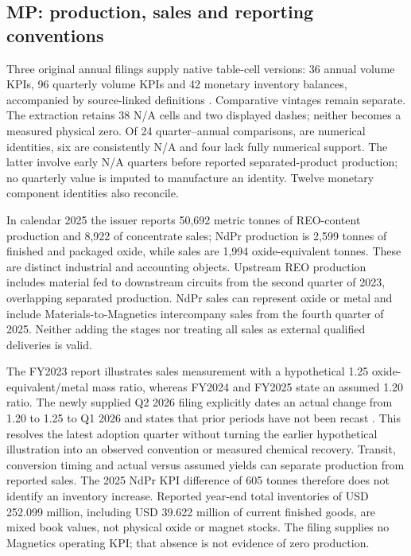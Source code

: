 \documentclass[11pt]{article}
\begin{document}
\subsection{MP: production, sales and reporting conventions}
Three original annual filings supply \MPNativeCells{} native table-cell versions: 36 annual volume KPIs, 96 quarterly volume KPIs and 42 monetary inventory balances, accompanied by \MPDefinitions{} source-linked definitions \citep{MP2023,MP2024,MP2025}. Comparative vintages remain separate. The extraction retains 38 N/A cells and two displayed dashes; neither becomes a measured physical zero. Of 24 quarter--annual comparisons, \MPNumericIdentities{} are numerical identities, six are consistently N/A and four lack fully numerical support. The latter involve early N/A quarters before reported separated-product production; no quarterly value is imputed to manufacture an identity. Twelve monetary component identities also reconcile.

In calendar 2025 the issuer reports 50,692 metric tonnes of REO-content production and 8,922 of concentrate sales; NdPr production is 2,599 tonnes of finished and packaged oxide, while sales are 1,994 oxide-equivalent tonnes. These are distinct industrial and accounting objects. Upstream REO production includes material fed to downstream circuits from the second quarter of 2023, overlapping separated production. NdPr sales can represent oxide or metal and include Materials-to-Magnetics intercompany sales from the fourth quarter of 2025. Neither adding the stages nor treating all sales as external qualified deliveries is valid.

The FY2023 report illustrates sales measurement with a hypothetical 1.25 oxide-equivalent/metal mass ratio, whereas FY2024 and FY2025 state an assumed 1.20 ratio. The newly supplied Q2 2026 filing explicitly dates an actual change from 1.20 to 1.25 to Q1 2026 and states that prior periods have not been recast \citep{MPQ22026}. This resolves the latest adoption quarter without turning the earlier hypothetical illustration into an observed convention or measured chemical recovery. Transit, conversion timing and actual versus assumed yields can separate production from reported sales. The 2025 NdPr KPI difference of 605 tonnes therefore does not identify an inventory increase. Reported year-end total inventories of USD 252.099 million, including USD 39.622 million of current finished goods, are mixed book values, not physical oxide or magnet stocks. The filing supplies no Magnetics operating KPI; that absence is not evidence of zero production.
\end{document}
